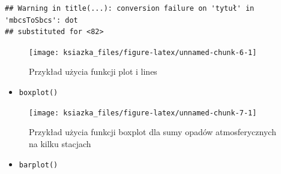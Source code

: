 \documentclass[]{book}
\newenvironment{Shaded}{\begin{snugshade}}{\end{snugshade}}
\newcommand{\KeywordTok}[1]{\textcolor[rgb]{0.13,0.29,0.53}{\textbf{#1}}}
\newcommand{\DataTypeTok}[1]{\textcolor[rgb]{0.13,0.29,0.53}{#1}}
\newcommand{\DecValTok}[1]{\textcolor[rgb]{0.00,0.00,0.81}{#1}}
\newcommand{\StringTok}[1]{\textcolor[rgb]{0.31,0.60,0.02}{#1}}
\newcommand{\OperatorTok}[1]{\textcolor[rgb]{0.81,0.36,0.00}{\textbf{#1}}}
\newcommand{\NormalTok}[1]{#1}
\providecommand{\tightlist}{%
  \setlength{\itemsep}{0pt}\setlength{\parskip}{0pt}}
\theoremstyle{definition}
\theoremstyle{definition}
\theoremstyle{definition}
\theoremstyle{remark}
\begin{document}
\begin{verbatim}
## Warning in title(...): conversion failure on 'tytuł' in 'mbcsToSbcs': dot
## substituted for <82>
\end{verbatim}

\begin{Shaded}
\end{Shaded}

\begin{figure}

{\centering \texttt{[image: ksiazka\_files/figure-latex/unnamed-chunk-6-1]} 

}

\caption{Przykład użycia funkcji plot i lines}\label{fig:unnamed-chunk-6}
\end{figure}

\begin{itemize}
\tightlist
\item
  \texttt{boxplot()}
\end{itemize}

\begin{Shaded}
\end{Shaded}

\begin{figure}

{\centering \texttt{[image: ksiazka\_files/figure-latex/unnamed-chunk-7-1]} 

}

\caption{Przykład użycia funkcji boxplot dla sumy opadów atmosferycznych na kilku stacjach}\label{fig:unnamed-chunk-7}
\end{figure}

\begin{itemize}
\tightlist
\item
  \texttt{barplot()}
\end{itemize}
\end{document}
